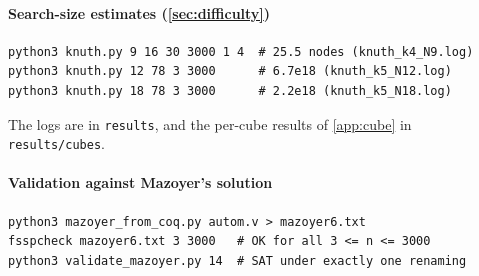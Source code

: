\paragraph{Search-size estimates (\cref{sec:difficulty})}
{\footnotesize
\begin{verbatim}
python3 knuth.py 9 16 30 3000 1 4  # 25.5 nodes (knuth_k4_N9.log)
python3 knuth.py 12 78 3 3000      # 6.7e18 (knuth_k5_N12.log)
python3 knuth.py 18 78 3 3000      # 2.2e18 (knuth_k5_N18.log)
\end{verbatim}}
The logs are in \texttt{results}, and the per-cube results of
\cref{app:cube} in \texttt{results/cubes}.

\paragraph{Validation against Mazoyer's solution}
{\footnotesize
\begin{verbatim}
python3 mazoyer_from_coq.py autom.v > mazoyer6.txt
fsspcheck mazoyer6.txt 3 3000   # OK for all 3 <= n <= 3000
python3 validate_mazoyer.py 14  # SAT under exactly one renaming
\end{verbatim}}
